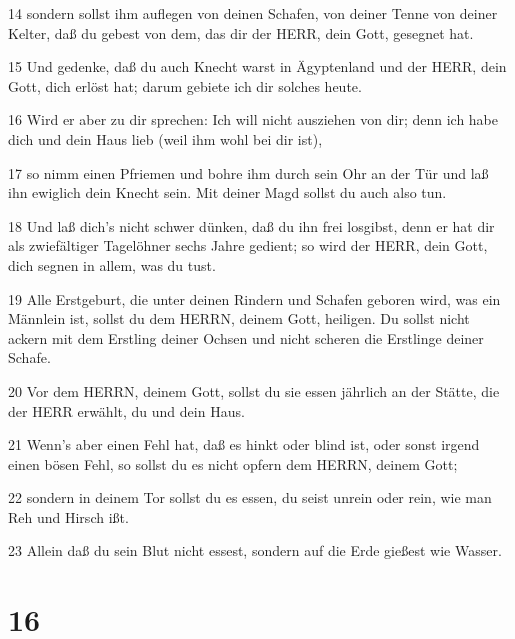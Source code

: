 \par 14 sondern sollst ihm auflegen von deinen Schafen, von deiner Tenne von deiner Kelter, daß du gebest von dem, das dir der HERR, dein Gott, gesegnet hat.
\par 15 Und gedenke, daß du auch Knecht warst in Ägyptenland und der HERR, dein Gott, dich erlöst hat; darum gebiete ich dir solches heute.
\par 16 Wird er aber zu dir sprechen: Ich will nicht ausziehen von dir; denn ich habe dich und dein Haus lieb (weil ihm wohl bei dir ist),
\par 17 so nimm einen Pfriemen und bohre ihm durch sein Ohr an der Tür und laß ihn ewiglich dein Knecht sein. Mit deiner Magd sollst du auch also tun.
\par 18 Und laß dich's nicht schwer dünken, daß du ihn frei losgibst, denn er hat dir als zwiefältiger Tagelöhner sechs Jahre gedient; so wird der HERR, dein Gott, dich segnen in allem, was du tust.
\par 19 Alle Erstgeburt, die unter deinen Rindern und Schafen geboren wird, was ein Männlein ist, sollst du dem HERRN, deinem Gott, heiligen. Du sollst nicht ackern mit dem Erstling deiner Ochsen und nicht scheren die Erstlinge deiner Schafe.
\par 20 Vor dem HERRN, deinem Gott, sollst du sie essen jährlich an der Stätte, die der HERR erwählt, du und dein Haus.
\par 21 Wenn's aber einen Fehl hat, daß es hinkt oder blind ist, oder sonst irgend einen bösen Fehl, so sollst du es nicht opfern dem HERRN, deinem Gott;
\par 22 sondern in deinem Tor sollst du es essen, du seist unrein oder rein, wie man Reh und Hirsch ißt.
\par 23 Allein daß du sein Blut nicht essest, sondern auf die Erde gießest wie Wasser.

\chapter{16}

